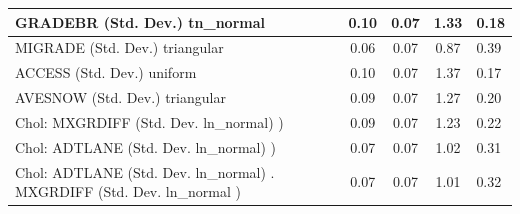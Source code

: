 \begin{table}
\begin{center}
\begin{tabular}{|l|l|c|c|c|l|}
			\hline
			GRADEBR (Std. Dev.) tn_normal &  & 0.10 & 0.07 & 1.33 & 0.18 \\
			\hline
			MIGRADE (Std. Dev.) triangular &  & 0.06 & 0.07 & 0.87 & 0.39 \\
			\hline
			ACCESS (Std. Dev.) uniform &  & 0.10 & 0.07 & 1.37 & 0.17 \\
			\hline
			AVESNOW (Std. Dev.) triangular &  & 0.09 & 0.07 & 1.27 & 0.20 \\
			\hline
			 Chol: MXGRDIFF (Std. Dev. ln_normal) ) &  & 0.09 & 0.07 & 1.23 & 0.22 \\
			\hline
			 Chol: ADTLANE (Std. Dev. ln_normal) ) &  & 0.07 & 0.07 & 1.02 & 0.31 \\
			\hline
			 Chol: ADTLANE (Std. Dev. ln_normal) . MXGRDIFF (Std. Dev.   ln_normal ) &  & 0.07 & 0.07 & 1.01 & 0.32 \\
			\hline
		\end{tabular}
	\end{center}
\end{table}